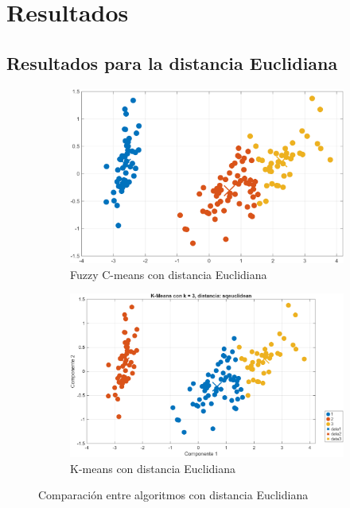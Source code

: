 \documentclass[11pt, letterpaper]{article}
\begin{document}
\newpage



\section{Resultados}

\subsection{Resultados para la distancia Euclidiana}

\begin{figure}[h!]
	\centering
	\begin{subfigure}[t]{0.48\textwidth}
		\centering
		\includegraphics[width=\linewidth]{IMG/R1.png}
		\caption{Fuzzy C-means con distancia Euclidiana}
		\label{fig:r1}
	\end{subfigure}
	\hspace{0.02\textwidth}
	\begin{subfigure}[t]{0.48\textwidth}
		\centering
		\includegraphics[width=\linewidth]{IMG/R2.png}
		\caption{K-means con distancia Euclidiana}
		\label{fig:r2}
	\end{subfigure}
	\caption{Comparación entre algoritmos con distancia Euclidiana}
\end{figure}
\end{document}
